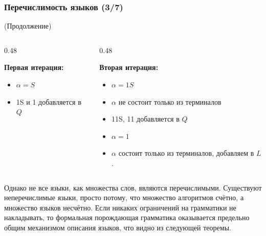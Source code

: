 \begin{frame}
    \frametitle{Перечислимость языков (3/7)}

    \begin{example} (Продолжение)
        \begin{columns}[T]
            \begin{column}{0.48\textwidth}

                \textbf{Первая итерация:}
                \begin{itemize}

                    \item $\alpha = S$
                    \item 1S и 1 добавляется в $Q$
                \end{itemize}
            \end{column}
            \begin{column}{0.48\textwidth}

                \textbf{Вторая итерация:}

                \begin{itemize}
                    \item $\alpha = \text{1}S$
                    \item $\alpha$ не состоит только из терминалов
                    \item 11S, 11 добавляется в $Q$

                    \item $\alpha = \text{1}$
                    \item $\alpha$ состоит только из терминалов, добавляем в $L$.
                \end{itemize}
            \end{column}
        \end{columns}
    \end{example}
    Однако не все языки, как множества слов, являются перечислимыми. Существуют неперечислимые языки, просто потому, что множество алгоритмов счётно, а множество языков несчётно. Если никаких ограничений на грамматики не накладывать, то формальная порождающая грамматика оказывается предельно общим механизмом описания языков, что видно из следующей теоремы.
\end{frame}


